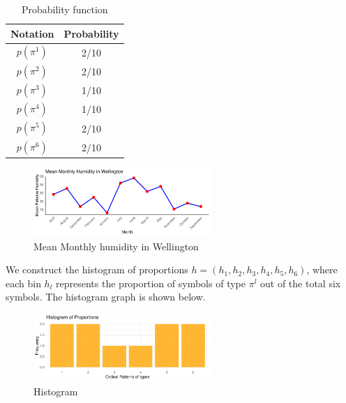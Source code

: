\begin{table}[ht]
	\caption{Probability function} %
	\centering %
	\begin{tabular}{c c	} %
		\hline\hline %
		Notation & Probability \\ [0.5ex] %
		\hline %
		$p(\pi^1)$ & 2/10 \\ 
		$p(\pi^2)$ & 2/10 \\
		$p(\pi^3)$ & 1/10 \\
		$p(\pi^4)$ & 1/10 \\
		$p(\pi^5)$ & 2/10 \\ 
		$p(\pi^6)$ & 2/10 \\[1ex] %
		\hline %
	\end{tabular}
	\label{table:nonlin} %
\end{table}

\begin{figure}[hbt]
	\centering
	\includegraphics[width=0.6\textwidth]{humidity graph}
	\caption{Mean Monthly humidity in Wellington}
\end{figure}

We construct the histogram of proportions $h=(h_1,h_2,h_3,h_4,h_5,h_6)$, where each bin $h_l$ represents the proportion of symbols of type $\pi^l$ out of the total six symbols. The histogram graph is shown below.

\begin{figure}[hbt]
	\centering
	\includegraphics[width=0.6\textwidth]{frequency histogram}
	\caption{Histogram}
\end{figure}






